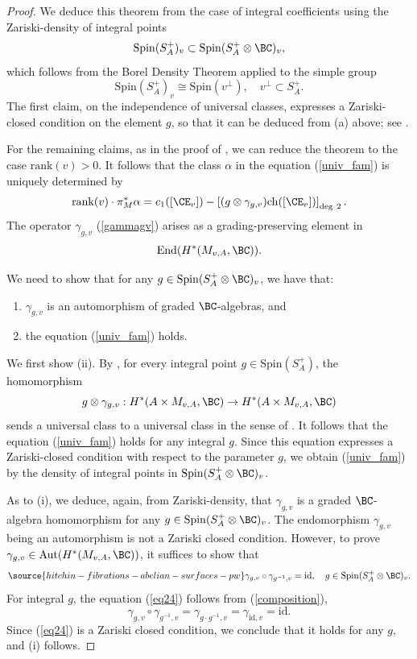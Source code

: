 \begin{proof}
We deduce this theorem  from the case of integral coefficients using the Zariski-density of integral points
\[
\mathrm{Spin}(S_A^+)_v \subset \mathrm{Spin}(S_A^+ \otimes \BC)_v,
\]
which follows from the Borel Density Theorem \cite{Borel} applied to the simple group
\[
\mathrm{Spin}(S_A^+)_v \cong \mathrm{Spin}(v^\perp), \quad v^\perp \subset S_A^+.
\]
The first claim, on the independence of universal classes, expresses a Zariski-closed condition on the element $g$, so that  it can be deduced from (a) above; see \cite[Lemma 3.11]{Markman2}.

For the remaining claims, as in the proof of \cite[Corollary 8.4]{Markman3}, we can reduce the theorem to the case $\mathrm{rank}(v) >0$. It follows that  the class $\alpha$ in the equation (\ref{univ_fam}) is uniquely determined  by
\[
\mathrm{rank}(v) \cdot \pi_M^\ast \alpha = c_1([\CE_v])- \left[(g\otimes \gamma_{g,v}) \mathrm{ch}([\CE_v])\right]_{\mathrm{deg}~2}.
\]
The operator $\gamma_{g,v}$  (\ref{gammagv})  arises as a grading-preserving element in
 \[
\mathrm{End}(H^*(M_{v,A}, \BC)).
\]

We need to show that for any $g\in \mathrm{Spin}(S_A^+ \otimes \BC)_v$, we have that:
\begin{enumerate}
    \item[(i)] $\gamma_{g,v}$ is an automorphism of graded $\BC$-algebras, and
    \item[(ii)] the equation (\ref{univ_fam}) holds.
\end{enumerate}

We first show (ii). By \cite[Corollary 8.4]{Markman3},  for every integral point $g \in \mathrm{Spin}(S_A^+)$, the homomorphism
\[
g\otimes \gamma_{g,v}: H^*(A \times M_{v,A}, \BC) \to H^*(A \times M_{v,A}, \BC)
\]
sends  a universal class to a universal class in the sense of \cite[Definition 3.4]{Markman3}.  It follows that the equation (\ref{univ_fam}) holds for any integral $g$. Since this equation expresses  a Zariski-closed condition with respect to the parameter $g$, we obtain (\ref{univ_fam}) by the density of integral points in $\mathrm{Spin}(S_A^+ \otimes \BC)_v$.


As to (i),  we deduce, again, from  Zariski-density, that $\gamma_{g,v}$ is a graded $\BC$-algebra  homomorphism for any $g\in \mathrm{Spin}(S_A^+ \otimes \BC)_v$. The endomorphism $\gamma_{g,v}$ being an automorphism is not a Zariski closed condition. However, to prove $\gamma_{g,v} \in \mathrm{Aut}(H^*(M_{v,A},\BC))$, it suffices to show that
\begin{equation}\label{eq24}
\source{hitchin-fibrations-abelian-surfaces-pw}
\gamma_{g,v} \circ \gamma_{g^{-1}, v} = \mathrm{id}, \quad g\in \mathrm{Spin}(S_A^+ \otimes \BC)_v.
\end{equation}
For integral $g$, the equation (\ref{eq24}) follows from (\ref{composition}),
\[
\gamma_{g,v} \circ \gamma_{g^{-1},v} = \gamma_{g\cdot g^{-1} , v} = \gamma_{\mathrm{id},v} = \mathrm{id}.
\]
Since (\ref{eq24}) is a Zariski closed condition, we conclude that it holds for any $g$, and (i) follows.
\end{proof}
